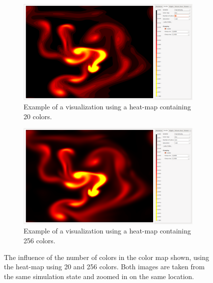\begin{figure}[tb]
	\centering
	\begin{subfigure}[t]{0.4\textwidth}
		\centering
		\includegraphics[width=\textwidth, trim={235px 30px 1230px 830px}, clip]{colormapping/img/heat20}
		\caption{Example of a visualization using a heat-map containing 20 colors.}
		\label{fig:colormapping:banding:20}
	\end{subfigure}
	\hspace{50px}
	\begin{subfigure}[t]{0.4\textwidth}
		\centering
		\includegraphics[width=\textwidth, trim={235px 30px 1230px 830px}, clip]{colormapping/img/heat256}
		\caption{Example of a visualization using a heat-map containing 256 colors.}
		\label{fig:colormapping:banding:256}
	\end{subfigure}	
	\caption{The influence of the number of colors in the color map shown, using the heat-map using  20 and  256 colors. Both images are taken from the same simulation state and zoomed in on the same location.}
	\label{fig:colormaps:banding}
\end{figure}

